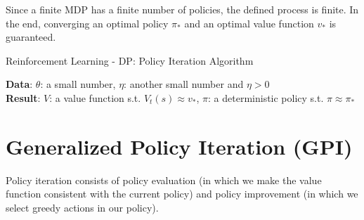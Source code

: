 Since a finite MDP has a finite number of policies, the defined process is finite. In the end, converging an optimal policy $\pi_*$ and an optimal value function $v_*$ is guaranteed.

\begin{algorithm}[h!]
    \caption{Reinforcement Learning - DP: Policy Iteration Algorithm}

    \textbf{Data}: $\theta$: a small number, $\eta$: another small number and $\eta > 0$\\
    \textbf{Result}: $V$: a value function s.t. $V_t(s) \approx v_*$, $\pi$: a deterministic policy s.t. $\pi \approx \pi_*$\\

\end{algorithm}



\section{Generalized Policy Iteration (GPI) \cite{medium/towardsdatascience.com/introduction-to-reinforcement-learning-rl-part-4-dynamic-programming-6af57e575b3d}}\label{Generalized Policy Iteration (GPI)}

Policy iteration consists of policy evaluation (in which we make the value function consistent with the current policy) and policy improvement (in which we select greedy actions in our policy).

